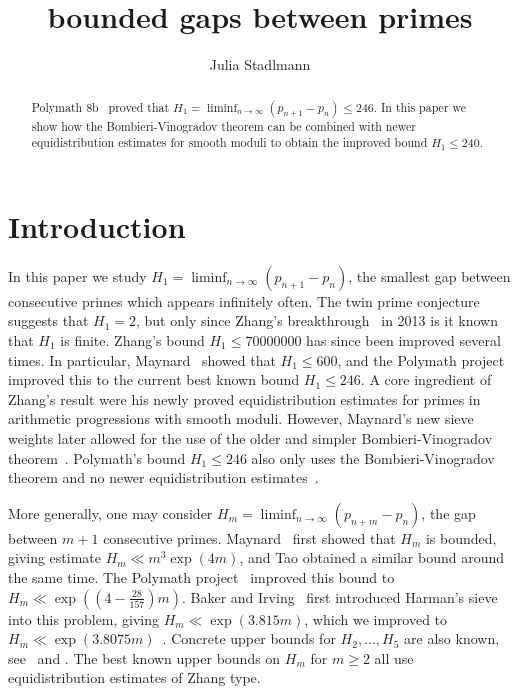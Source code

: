\documentclass{amsart}
\numberwithin{equation}{section}
\begin{document}
\begin{abstract}
Polymath 8b~\cite{Polymath:2014:VSS} proved that $H_1= \liminf_{n \rightarrow \infty} (p_{n+1}-p_n) \leq 246$.  In this paper we show how the Bombieri-Vinogradov theorem  can be combined  with newer equidistribution estimates for smooth moduli to obtain the improved bound   $H_1 \leq 240$.  
\end{abstract}


\title{ bounded gaps between primes}
\date{}
\author{Julia Stadlmann}
\maketitle

\vspace{-5mm} 

\section{Introduction}\label{sec:intro}


\vspace{3mm} In this paper we study  $H_1= \liminf_{n \rightarrow \infty} (p_{n+1}-p_n)$, the smallest gap between consecutive primes which appears infinitely often.  The twin prime conjecture suggests that $H_1=2$, but only since  Zhang's breakthrough~\cite{Zhang:2015:BGP} in 2013 is it  known that $H_1$ is finite. Zhang's bound $H_1 \leq 70000000$ has since been improved several times. In particular, Maynard~\cite{Maynard:2015:SGP} showed that $H_1 \leq  600$, and the Polymath project~\cite{Polymath:2014:VSS} improved this to the current best known bound $H_1 \leq  246$. A core ingredient of Zhang's result were his newly proved equidistribution estimates for primes in arithmetic progressions with smooth moduli. However, Maynard's new sieve weights later allowed for the use of the older and   simpler Bombieri-Vinogradov theorem~\cite{Maynard:2015:SGP}. Polymath's bound $H_1 \leq 246$ also only uses the Bombieri-Vinogradov theorem and no newer equidistribution estimates~\cite{Polymath:2014:VSS}.

\medskip

More generally, one may consider $H_m=\liminf_{n \rightarrow \infty} (p_{n+m}-p_n)$, the gap between $m+1$ consecutive primes.   Maynard~\cite{Maynard:2015:SGP} first showed that $H_m$ is bounded, giving estimate $H_m \ll m^3 \exp(4m)$, and  Tao obtained a similar bound around the same time. The Polymath project~\cite{Polymath:2014:VSS} improved this bound to  $H_m \ll \exp((4-\frac{28}{157})m)$. Baker and Irving~\cite{Baker:2017:BIP} first introduced Harman's sieve into this problem, giving  $H_m \ll \exp(3.815 m)$, which we improved to $H_m \ll \exp(3.8075 m)$~\cite{Stadlmann:2023:PAP}. Concrete upper bounds for $H_2, \dots, H_5$ are also known, see~\cite{Polymath:2014:VSS} and \cite{Stadlmann:2023:PAP}.
 The best known upper bounds on $H_m$ for $m\geq 2$ all use equidistribution estimates of Zhang type. 
 
\end{document}
